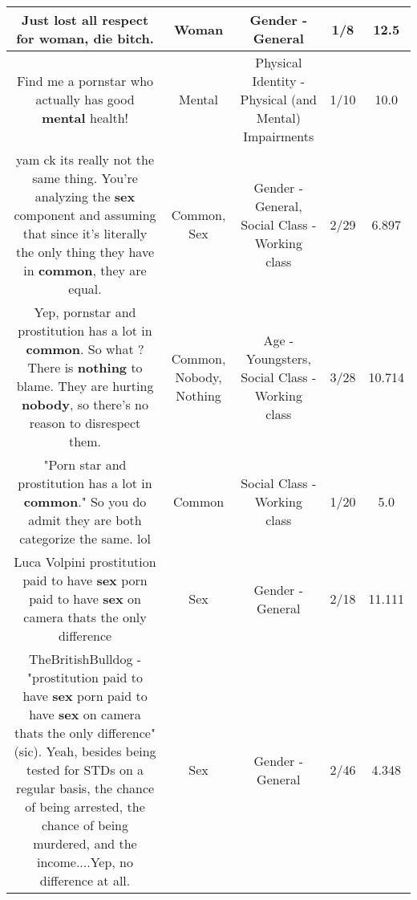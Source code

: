\documentclass[11pt]{article}
\newlength\mylength
\begin{document}
\begin{center}
\begin{longtable}{|C{.65\mylength}|C{.30\mylength}|C{.12\mylength}|C{.12\mylength}|C{.12\mylength}|}
  \small Just lost all respect for \textbf{woman}, die bitch.\normalsize   & Woman & Gender - General & 1/8 & 12.5 \\  \hline
  \small Find me a pornstar who actually has good \textbf{mental} health!\normalsize   & Mental & Physical Identity - Physical (and Mental) Impairments & 1/10 & 10.0 \\  \hline
  \small yam ck its really not the same thing. You're analyzing the \textbf{sex} component and assuming that since it's literally the only thing they have in \textbf{common}, they are equal.\normalsize   & Common, Sex & Gender - General, Social Class - Working class & 2/29 & 6.897 \\  \hline
  \small Yep, pornstar and prostitution has a lot in \textbf{common}. So what ? There is \textbf{nothing} to blame. They are hurting \textbf{nobody}, so there's no reason to disrespect them.\normalsize   & Common, Nobody, Nothing & Age - Youngsters, Social Class - Working class & 3/28 & 10.714 \\  \hline
  \small "Porn star and prostitution has a lot in \textbf{common}." So you do admit they are both categorize the same. lol\normalsize   & Common & Social Class - Working class & 1/20 & 5.0 \\  \hline
  \small Luca Volpini prostitution paid to have \textbf{sex} porn paid to have \textbf{sex} on camera thats the only difference\normalsize   & Sex & Gender - General & 2/18 & 11.111 \\  \hline
  \small TheBritishBulldog - "prostitution paid to have \textbf{sex} porn paid to have \textbf{sex} on camera thats the only difference" (sic). Yeah, besides being tested for STDs on a regular basis, the chance of being arrested, the chance of being murdered, and the income....Yep, no difference at all.\normalsize   & Sex & Gender - General & 2/46 & 4.348 \\  \hline

\end{longtable}
\end{center}
\end{document}
